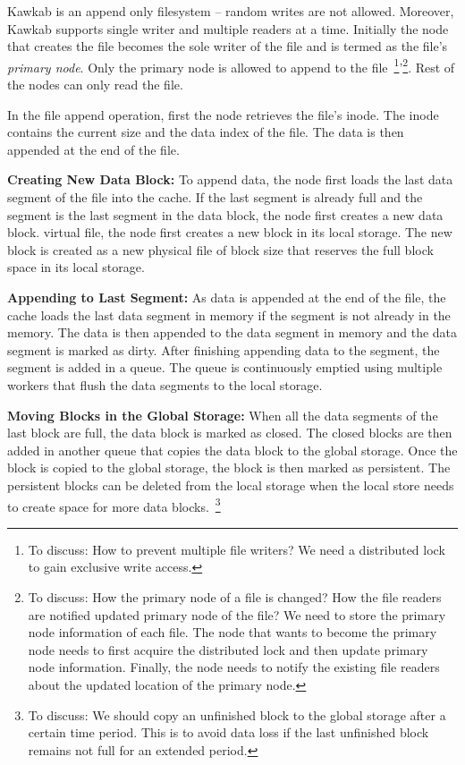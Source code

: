 \documentclass[]{article}
\newcommand{\subtopic}[1]{\vspace{1.5pt} \noindent \textbf{#1}}
\newcommand{\hl}[1]{\textcolor{hlcolor}{#1}}
\begin{document}
Kawkab is an append only filesystem -- random writes are not allowed.
Moreover, Kawkab supports single writer and multiple readers at a time.
Initially the node that creates the file becomes the sole writer of the file
and is termed as the file's \textit{primary node}. Only the primary node is
allowed to append to the file~\footnote{ \hl{To discuss: How to prevent multiple file
writers? We need a distributed lock to gain exclusive write
access.}}'\footnote{ \hl{To discuss: How the primary node of a file is changed? How
the file readers are notified updated primary node of the file? We need to
store the primary node information of each file. The node that wants to become
the primary node needs to first acquire the distributed lock and then update
primary node information. Finally, the node needs to notify the existing file
readers about the updated location of the primary node.}}.
Rest of the nodes can only read the file.

In the file append operation, first the node retrieves the file's inode. The
inode contains the current size and the data index of the file. The
data is then appended at the end of the file. 

\subtopic{Creating New Data Block:} To append data, the node first loads the
last data segment of the file into the cache.  If the last segment is already
full and the segment is the last segment in the data block, the node first
creates a new data block.%
virtual file, the node first creates a new block in its local storage.  The new
block is created as a new physical file of block size that reserves the full
block space in its local storage.

\subtopic{Appending to Last Segment:}
As data is appended at the end of the file, the cache loads the last data segment
in memory if the segment is not already in the memory.
The data is then appended to the data segment in memory and the data segment
is marked as dirty. After finishing appending data to the segment, the
segment is added in a queue. The queue is continuously emptied using multiple
workers that flush the data segments to the local storage.

\subtopic{Moving Blocks in the Global Storage:}
When all the data segments of the last block are full, the data block is marked
as closed. The closed blocks are then added in another queue that copies
the data block to the global storage. Once the block is copied to the global
storage, the block is then marked as persistent. The persistent blocks
can be deleted from the local storage when the local store needs to create
space for more data blocks.~\footnote{\hl{To discuss: We should copy an unfinished
block to the global storage after a certain time period. This is to avoid data
loss if the last unfinished block remains not full for an extended period.}}
\end{document}
